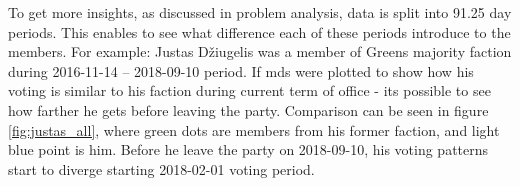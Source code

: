 \documentclass[a4paper,12pt]{article}
\begin{document}
	To get more insights, as discussed in problem analysis, data is split into 91.25 day periods. This enables to see what difference each of these periods introduce to the members. For example: Justas Džiugelis was a member of Greens majority faction during 2016-11-14 – 2018-09-10 period. If \gls{mds} were plotted to show how his voting is similar to his faction during current term of office - its possible to see how farther he gets before leaving the party. Comparison can be seen in figure \ref{fig:justas_all}, where green dots are members from his former faction, and light blue point is him. Before he leave the party on 2018-09-10, his voting patterns start to diverge starting 2018-02-01 voting period.
	
	\begin{figure}[!tbp]
		\centering
		\hfill
		\hfill
		\hfill

\end{figure}
\end{document}
